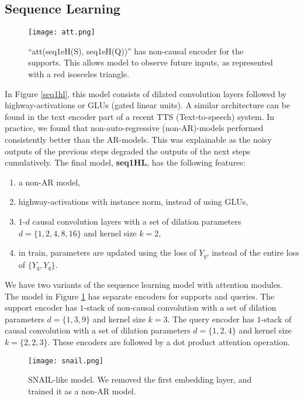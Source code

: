 \subsection{Sequence Learning}
\begin{figure}
\texttt{[image: att.png]}
\caption{``att(seq1eH(S), seq1eH(Q))'' has non-causal encoder for the supports. This allows model to observe future inputs, as represented with a red isosceles triangle.}
\label{att}
\end{figure}
In Figure \ref{seq1hl}, this model consists of dilated convolution layers followed by highway\cite{srivastava2015highway}-activations or GLUs (gated linear units\cite{dauphin2016language}). A similar architecture can be found in the text encoder part of a recent TTS (Text-to-speech) system\cite{dctts}. In practice, we found that non-auto-regressive (non-AR)-models performed consistently better than the AR-models. This was explainable as the noisy outputs of the previous steps degraded the outputs of the next steps cumulatively. The final model, \textbf{seq1HL}, has the following features:
\begin{enumerate}
    \item a non-AR model,
    \item highway-activations with instance norm\cite{vedaldi2016instance}, instead of using GLUs,
    \item $1$-$d$ causal convolution layers with a set of dilation parameters $d = \{1,2,4,8,16\}$ and kernel size $k=2$,
    \item in train, parameters are updated using the loss of $Y_q$, instead of the entire loss of $\{Y_q, Y_q\}$.
\end{enumerate}

We have two variants of the sequence learning model with attention modules. The model in Figure \ref{att} has separate encoders for supports and queries. The support encoder has $1$-stack of non-causal convolution with a set of dilation parameters $d = \{1,3,9\}$ and kernel size $k=3$. The query encoder has $1$-stack of causal convolution with a set of dilation parameters $d = \{1,2,4\}$  and kernel size $k=\{2,2,3\}$. These encoders are followed by a dot product attention operation\cite{vaswani2017attention}. 

\begin{figure}
\texttt{[image: snail.png]}
\caption{SNAIL\cite{snail}-like model. We removed the first embedding layer, and trained it as a non-AR model.}
\label{snailf}
\end{figure}


